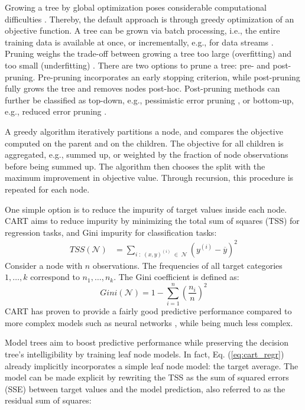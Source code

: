 \documentclass[a4paper, 11pt]{article}
\newcommand{\Node}{\mathcal{N}}
\begin{document}
Growing a tree by global optimization poses considerable computational difficulties \cite{norouzi_nongreedy_tree}. Thereby, the default approach is through greedy optimization of an objective function. A tree can be grown via batch processing, i.e., the entire training data is available at once, or incrementally, e.g., for data streams \cite{potts_incremental_model_tree}. Pruning weighs the trade-off between growing a tree too large (overfitting) and too small (underfitting) \cite{hastie_elemstatlearn}. There are two options to prune a tree: pre- and post-pruning. Pre-pruning incorporates an early stopping criterion, while post-pruning fully grows the tree and removes nodes post-hoc. Post-pruning methods can further be classified as top-down, e.g., pessimistic error pruning \cite{quinlan_simplifying}, or bottom-up, e.g., reduced error pruning \cite{quinlan_simplifying}.
\par
A greedy algorithm iteratively partitions a node, and compares the objective computed on the parent and on the children. The objective for all children is aggregated, e.g., summed up, or weighted by the fraction of node observations before being summed up. The algorithm then chooses the split with the maximum improvement in objective value. Through recursion, this procedure is repeated for each node.
\par 
One simple option is to reduce the impurity of target values inside each node. CART aims to reduce impurity by minimizing the total sum of squares (TSS) for regression tasks, and Gini impurity for classification tasks:
\begin{align}
TSS(\Node) &= \sum_{i \;:\; (x, y)^{(i)} \;\in\; \Node} \left(y^{(i)} - \overline{y}\right)^2
\label{eq:cart_regr}
\end{align}
Consider a node with $n$ observations. The frequencies of all target categories $1, \dots, k$ correspond to $n_1, \dots, n_k$. The Gini coefficient is defined as:
$$
Gini(\Node) = 1 - \sum_{i = 1}^n \left(\frac{n_i}{n}\right)^2
$$
CART has proven to provide a fairly good predictive performance compared to more complex models such as neural networks \cite{razi_cart_comparison}, while being much less complex.
\par
Model trees aim to boost predictive performance while preserving the decision tree's intelligibility by training leaf node models. In fact, Eq. (\ref{eq:cart_regr}) already implicitly incorporates a simple leaf node model: the target average. The model can be made explicit by rewriting the TSS as the sum of squared errors (SSE) between target values and the model prediction, also referred to as the residual sum of squares:
\end{document}
